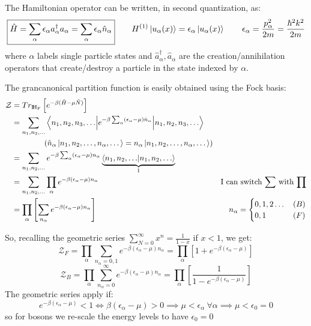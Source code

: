 
The Hamiltonian operator can be written, in second quantization, as:
$$\boxed{\hat H = \sum_\alpha \epsilon_\alpha a_\alpha^\dag a_\alpha = \sum_\alpha \epsilon_\alpha \hat n_\alpha} \qquad H^{(1)}\left|u_\alpha(x)\right\rangle = \epsilon_\alpha\left|u_\alpha(x)\right\rangle \qquad \epsilon_\alpha = \frac{p_\alpha^2}{2m}= \frac{\hbar^2 k^2}{2m}$$
where $\alpha$ labels single particle states and $\hat a^\dag_\alpha, \hat a_\alpha$ are the creation/annihilation operators that create/destroy a particle in the state indexed by $\alpha$.

The grancanonical partition function is easily obtained using the Fock basis:
\begin{align*}
    \mathcal Z&= Tr_{\fock_F}\left[e^{-\beta(\hat H - \mu \hat N)}\right] \\
    &= \sum_{n_1,n_2,\dots} \brakett{n_1,n_2,n_3,\dots}{e^{-\beta \sum_\alpha(\epsilon_\alpha - \mu)\hat n_\alpha}}{n_1,n_2,n_3,\dots}\\
    &\qquad\qquad  \left(\hat n_\alpha \ket{n_1,n_2,\dots, n_\alpha,\dots} = n_\alpha\ket{n_1,n_2,\dots,n_\alpha,\dots}\right)\\
    &= \sum_{n_1,n_2,\dots} e^{-\beta \sum_\alpha(\epsilon_\alpha - \mu)n_\alpha}\underbrace{\braket{n_1,n_2,\dots}{n_1,n_2,\dots}}_1\\
    &= \sum_{n_1,n_2,\dots} \prod_\alpha e^{-\beta (\epsilon_\alpha - \mu)n_\alpha} &\text{I can switch $\sum$ with $\prod$}\\
    &= \prod_\alpha \left[\sum_{n_\alpha} e^{-\beta (\epsilon_\alpha - \mu)n_\alpha}\right] & n_\alpha = \begin{cases} 0,1,2 \dots &(B)\\ 0,1 &(F)\end{cases}
\end{align*}

So, recalling the geometric series $\sum_{N=0}^\infty x^n = \frac 1{1-x}$ if $x<1$, we get:
$$\mathcal Z_F = \prod_\alpha \sum_{n_\alpha = 0,1} e^{-\beta (\epsilon_\alpha - \mu)n_\alpha} = \prod_\alpha \left[1+ e^{-\beta (\epsilon_\alpha -\mu)}\right]$$
$$\mathcal Z_B = \prod_\alpha \sum_{n_\alpha = 0}^\infty e^{-\beta (\epsilon_\alpha - \mu)n_\alpha} = \prod_\alpha \left[\frac1{1- e^{-\beta (\epsilon_\alpha -\mu)}}\right]$$
The geometric series apply if:
$$ e^{-\beta (\epsilon_\alpha -\mu)} < 1 \iff \beta (\epsilon_\alpha -\mu) > 0 \implies \mu < \epsilon_\alpha \ \forall \alpha \implies \mu < \epsilon_0 = 0$$
so for bosons we re-scale the energy levels to have $\epsilon_0 = 0$\\


